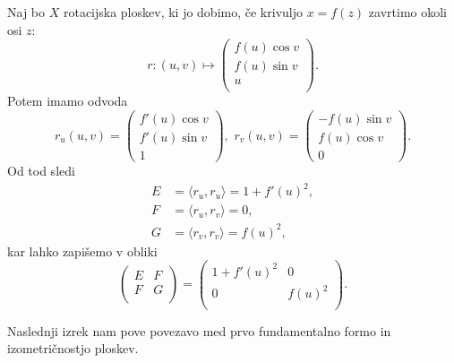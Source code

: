 \begin{primer}
 Naj bo $X$ rotacijska ploskev, ki jo dobimo, če krivuljo $x =  f(z)$
 zavrtimo okoli osi $z$: 
 \begin{equation*} r: \left( u,v \right) \mapsto  
\begin{pmatrix}
	f(u) \cos v \\
	f(u) \sin v \\
	u \\
\end{pmatrix}
.\end{equation*}Potem imamo odvoda 
\begin{equation*}   r_u(u,v) = \begin{pmatrix} f'(u) \cos v \\ f'(u) \sin v \\ 1
\end{pmatrix}, \,\,  r_v(u,v) = 
\begin{pmatrix}-f(u) \sin  v \\ f(u) \cos v \\ 0
\end{pmatrix}.\end{equation*}
Od tod sledi 
\begin{align*}
    E &= \langle r_u, r_u \rangle = 1 + f'(u)^2, \\
    F &= \langle r_u, r_v \rangle = 0, \\
	G &= \langle r_v, r_v \rangle = f(u)^2,
\end{align*}
kar lahko zapišemo v obliki 
\begin{equation*} 
\begin{pmatrix}
	E & F \\
	F & G \\
\end{pmatrix}
=
\begin{pmatrix}
	1 + f'(u)^2 & 0 \\
	0 & f(u)^2 \\
\end{pmatrix}
.
\end{equation*}
\end{primer}

Naslednji izrek nam pove povezavo med prvo fundamentalno formo in izometričnostjo ploskev.


